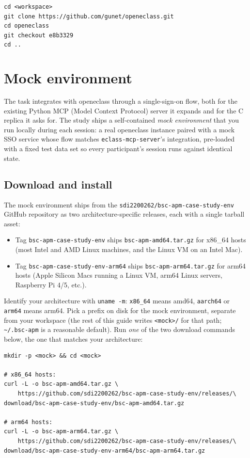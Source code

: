 \documentclass[11pt, a4paper]{article}
\begin{document}
\begin{verbatim}
cd <workspace>
git clone https://github.com/gunet/openeclass.git
cd openeclass
git checkout e8b3329
cd ..
\end{verbatim}

\section{Mock environment}
\label{sec:env}

The task integrates with openeclass through a single-sign-on flow, both for the existing Python MCP (Model Context Protocol) server it expands and for the C replica it asks for. The study ships a self-contained \emph{mock environment} that you run locally during each session: a real openeclass instance paired with a mock SSO service whose flow matches \texttt{eclass-mcp-server}'s integration, pre-loaded with a fixed test data set so every participant's session runs against identical state.

\subsection{Download and install}
\label{sec:env:install}

The mock environment ships from the \texttt{sdi2200262/bsc-apm-case-study-env} GitHub repository as two architecture-specific releases, each with a single tarball asset:

\begin{itemize}
    \item Tag \texttt{bsc-apm-case-study-env} ships \texttt{bsc-apm-amd64.tar.gz} for x86\_64 hosts (most Intel and AMD Linux machines, and the Linux VM on an Intel Mac).
    \item Tag \texttt{bsc-apm-case-study-env-arm64} ships \texttt{bsc-apm-arm64.tar.gz} for arm64 hosts (Apple Silicon Macs running a Linux VM, arm64 Linux servers, Raspberry Pi 4/5, etc.).
\end{itemize}

Identify your architecture with \texttt{uname -m}: \texttt{x86\_64} means amd64, \texttt{aarch64} or \texttt{arm64} means arm64. Pick a prefix on disk for the mock environment, separate from your workspace (the rest of this guide writes \texttt{<mock>/} for that path; \texttt{\textasciitilde/.bsc-apm} is a reasonable default). Run \emph{one} of the two download commands below, the one that matches your architecture:

\begin{verbatim}
mkdir -p <mock> && cd <mock>

# x86_64 hosts:
curl -L -o bsc-apm-amd64.tar.gz \
    https://github.com/sdi2200262/bsc-apm-case-study-env/releases/\
download/bsc-apm-case-study-env/bsc-apm-amd64.tar.gz

# arm64 hosts:
curl -L -o bsc-apm-arm64.tar.gz \
    https://github.com/sdi2200262/bsc-apm-case-study-env/releases/\
download/bsc-apm-case-study-env-arm64/bsc-apm-arm64.tar.gz
\end{verbatim}
\end{document}
